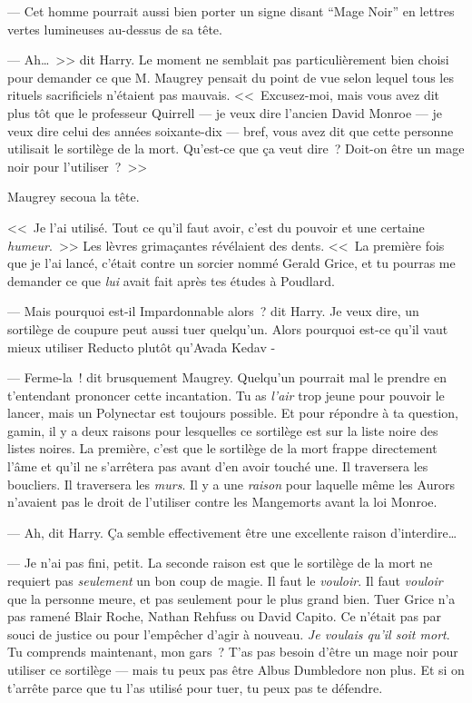 --- Cet homme pourrait aussi bien porter un signe disant “Mage Noir” en lettres vertes lumineuses au-dessus de sa tête.

--- Ah…~>> dit Harry. Le moment ne semblait pas particulièrement bien choisi pour demander ce que M. Maugrey pensait du point de vue selon lequel tous les rituels sacrificiels n'étaient pas mauvais. <<~Excusez-moi, mais vous avez dit plus tôt que le professeur Quirrell — je veux dire l'ancien David Monroe — je veux dire celui des années soixante-dix — bref, vous avez dit que cette personne utilisait le sortilège de la mort. Qu'est-ce que ça veut dire~? Doit-on être un mage noir pour l'utiliser~?~>>

Maugrey secoua la tête.

<<~Je l'ai utilisé. Tout ce qu'il faut avoir, c'est du pouvoir et une certaine \emph{humeur}.~>> Les lèvres grimaçantes révélaient des dents. <<~La première fois que je l'ai lancé, c'était contre un sorcier nommé Gerald Grice, et tu pourras me demander ce que \emph{lui} avait fait après tes études à Poudlard.

--- Mais pourquoi est-il Impardonnable alors~? dit Harry. Je veux dire, un sortilège de coupure peut aussi tuer quelqu'un. Alors pourquoi est-ce qu'il vaut mieux utiliser Reducto plutôt qu'Avada Kedav -

--- Ferme-la~! dit brusquement Maugrey. Quelqu'un pourrait mal le prendre en t'entendant prononcer cette incantation. Tu as \emph{l'air} trop jeune pour pouvoir le lancer, mais un Polynectar est toujours possible. Et pour répondre à ta question, gamin, il y a deux raisons pour lesquelles ce sortilège est sur la liste noire des listes noires. La première, c'est que le sortilège de la mort frappe directement l'âme et qu'il ne s'arrêtera pas avant d'en avoir touché une. Il traversera les boucliers. Il traversera les \emph{murs}. Il y a une \emph{raison} pour laquelle même les Aurors n'avaient pas le droit de l'utiliser contre les Mangemorts avant la loi Monroe.

--- Ah, dit Harry. Ça semble effectivement être une excellente raison d'interdire…

--- Je n'ai pas fini, petit. La seconde raison est que le sortilège de la mort ne requiert pas \emph{seulement} un bon coup de magie. Il faut le \emph{vouloir}. Il faut \emph{vouloir} que la personne meure, et pas seulement pour le plus grand bien. Tuer Grice n'a pas ramené Blair Roche, Nathan Rehfuss ou David Capito. Ce n'était pas par souci de justice ou pour l'empêcher d'agir à nouveau. \emph{Je voulais qu'il soit mort}. Tu comprends maintenant, mon gars~? T'as pas besoin d'être un mage noir pour utiliser ce sortilège — mais tu peux pas être Albus Dumbledore non plus. Et si on t'arrête parce que tu l'as utilisé pour tuer, tu peux pas te défendre.

